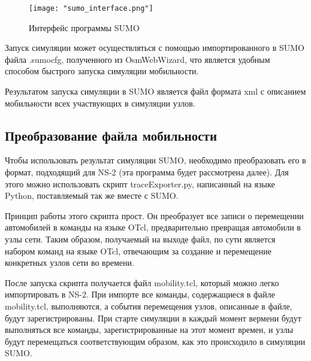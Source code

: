 \begin{figure}[!h]
    \centering
    \texttt{[image: "sumo\_interface.png"]}
    \caption{Интерфейс программы SUMO}
    \label{fig:sumo_interface}
\end{figure}

Запуск симуляции может осуществляться с помощью импортированного в SUMO файла .sumocfg, полученного из OsmWebWizard, что является удобным способом быстрого запуска симуляции мобильности.

Результатом запуска симуляции в SUMO является файл формата xml с описанием мобильности всех участвующих в симуляции узлов.

\subsection{Преобразование файла мобильности}

Чтобы использовать результат симуляции SUMO, необходимо преобразовать его в формат, подходящий для NS-2 (эта программа будет рассмотрена далее). Для этого можно использовать скрипт traceExporter.py, написанный на языке Python, поставляемый так же вместе с SUMO.

Принцип работы этого скрипта прост. Он преобразует все записи о перемещении автомобилей в команды на языке OTcl, предварительно превращая автомобили в узлы сети. Таким образом, получаемый на выходе файл, по сути является набором команд на языке OTcl, отвечающим за создание и перемещение конкретных узлов сети во времени.

После запуска скрипта получается файл mobility.tcl, который можно легко импортировать в NS-2. При импорте все команды, содержащиеся в файле mobility.tcl, выполняются, а события перемещения узлов, описанные в файле, будут зарегистрированы. При старте симуляции в каждый момент вермени будут выполняться все команды, зарегистрированные на этот момент времен, и узлы будут перемещаться соответствующим образом, как это происходило в симуляции SUMO.
